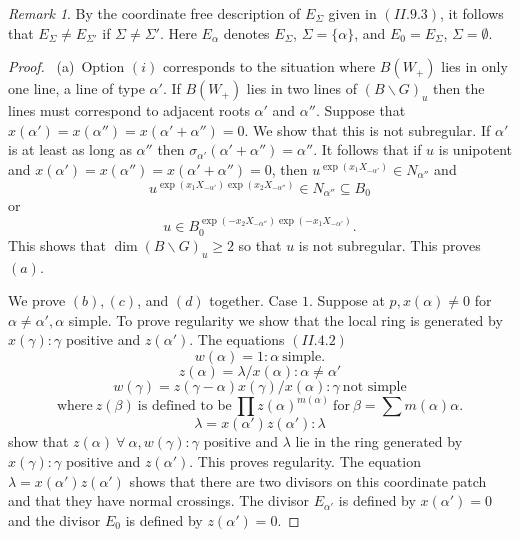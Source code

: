 \documentclass{memo-l}
\theoremstyle{definition}
\theoremstyle{remark}
\newtheorem*{remark*}{Remark} %
\numberwithin{section}{chapter}
\numberwithin{equation}{chapter}
\begin{document}
\begin{remark*} %
By the coordinate free
description of $E_{{\Sigma}}$ given in $(II.9.3)$, it follows that
$E_{{\Sigma}} \ne E_{{\Sigma}'}$ if ${\Sigma} \ne {\Sigma}'$.  Here $E_\alpha$
denotes $E_\Sigma$, $\Sigma=\{\alpha\}$, and $E_0 = E_\Sigma$, $\Sigma=\emptyset$.
\end{remark*}

\begin{proof} \ (a)\ Option $(i)$ corresponds to the situation where
$B(W_{+})$ lies in only one line, a line of type ${\alpha}'$.  If
$B(W_{+})$ lies in two lines of $(B\backslash G)_{u}$ then the lines must
correspond to adjacent roots ${\alpha}'$ and ${\alpha}''$.  Suppose that
$x({\alpha}')  =  x({\alpha}'')  =  x({\alpha}'+{\alpha}'')  =  0$.  We show that this is
not subregular.  If ${\alpha}'$ is at least as long as ${\alpha}''$ then
${\sigma}_{{\alpha}'}({\alpha}'+{\alpha}'')  =  {\alpha}''$.  It follows that if
$u$ is unipotent and $x({\alpha}')  =  x({\alpha''})  =  x({\alpha}'+{\alpha''})  =  0$,
then $u^{\exp(x_{1}X_{-{\alpha}'})} \in N_{{\alpha}''}$ and
$$
u^{\exp(x_{1}X_{-{\alpha}'})\exp(x_{2}X_{-{\alpha}''})} \in
N_{{\alpha}''} {\subseteq} B_{0}
$$
or
$$
u \in B_{0}^ { \exp(-x_{2}X_{-{\alpha}''}) \exp(-x_{1}X_{-{\alpha}'}) }.
$$
This shows that $\dim(B\backslash G)_{u} \ge 2$ so that $u$ is not
subregular.  This proves $(a)$.

   We prove $(b),(c)$, and $(d)$ together.  Case $1$.  Suppose at $p,
x({\alpha})\ne 0$ for ${\alpha} \ne {\alpha}', {\alpha}$ simple.  To prove
regularity we show that the local ring is generated by
$x({\gamma}): {\gamma}$ positive and $z({\alpha}')$.  The equations $(II.4.2)$
$$
w({\alpha})  =  1 : {\alpha}\ {\text{simple}}.
$$
$$
z({\alpha})  =  {\lambda}/x({\alpha}) : {\alpha} \ne {\alpha}'
$$
$$
w({\gamma})  =  z({\gamma}-{\alpha})x({\gamma})/x({\alpha}) : {\gamma}\
{\text{not\ simple}}
$$
$$
{\text{where}}\ z({\beta})\ {\text{is\ defined\ to\ be}}\ \prod
z({\alpha})^{m({\alpha})}\ {\text{for}}\  {\beta}  =  \sum m({\alpha}){\alpha}.
$$
$$
{\lambda}  =  x({\alpha}')z({\alpha}') : {\lambda}
$$
show that $z({\alpha}) {\ \forall\ } {\alpha}, w({\gamma}) : {\gamma}$
positive and ${\lambda}$ lie in the ring generated by $x({\gamma}) :
{\gamma}$ positive and $z({\alpha}')$.  This proves regularity.  The
equation ${\lambda}  =  x({\alpha}')z({\alpha}')$ shows that there are two
divisors on this coordinate patch and that they have normal crossings.  The
divisor $E_{{\alpha}'}$ is defined by $x({\alpha}')  =  0$ and the divisor
$E_{0}$ is defined by $z({\alpha}')  =  0$.


\end{proof}
\end{document}
